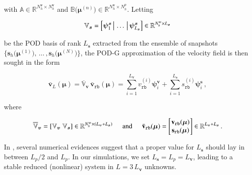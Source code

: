 \documentclass[longtitle]{elsarticle}
\numberwithin{equation}{section}
\theoremstyle{theorem}
\theoremstyle{definition}
\theoremstyle{remark}
\theoremstyle{proposition}
\numberwithin{figure}{section}
\newcommand{\bg}[1]{\boldsymbol{#1}}
\begin{document}
		with $\mathbb{A} \in \mathbb{R}^{N_h^{\bg{v}} \times N_h^{\bg{v}}}$ and $\mathbb{B} \big( \bg{\mu}^{(n)} \big) \in \mathbb{R}^{N_h^{\bg{v}} \times N_h^p}$. Letting 
		\vspace*{-0.1cm}
		\begin{linenomath}\begin{equation*}
			\mathbb{V}_{\bg{s}} = \left[ \bg{\psi}_1^{\bg{s}} \, \big| \, \ldots \, \big| \, \bg{\psi}_{L_{\bg{s}}}^{\bg{s}} \right] \in \mathbb{R}^{N_h^{\bg{v}} \times L_{\bg{s}}} 
			\vspace*{-0.1cm}
		\end{equation*}\end{linenomath}
		be the POD basis of rank $L_{\bg{s}}$ extracted from the ensemble of snapshots $\big\lbrace \mathbf{s}_h \big( \bg{\mu}^{(1)} \big) , \, \ldots \, , \mathbf{s}_h \big( \bg{\mu}^{(N)} \big) \big\rbrace$, the POD-G approximation of the velocity field is then sought in the form
		\vspace*{-0.2cm}
		\begin{linenomath}\begin{equation*}
			\bar{\mathbf{v}}_L(\bg{\mu}) = \overline{\mathbb{V}}_{\bg{v}} \, \bar{\mathbf{v}}_{\texttt{rb}}(\bg{\mu}) = \sum_{i = 1}^{L_{\bg{v}}} v_{\texttt{rb}}^{(i)} \bg{\psi}_i^{\bg{v}} + \sum_{i = 1}^{L_{\bg{s}}} s_{\texttt{rb}}^{(i)} \bg{\psi}_i^{\bg{s}} \, ,
		\end{equation*}\end{linenomath} 
		where
		\begin{linenomath}\begin{equation*}
			\overline{\mathbb{V}}_{\bg{v}} = \left[ \mathbb{V}_{\bg{v}} ~ \mathbb{V}_{\bg{s}} \right] \in \mathbb{R}^{N_h^{\bg{v}} \times (L_{\bg{v}} + L_{\bg{s}})} \hspace*{0.5cm} \text{and} \hspace*{0.5cm} \bar{\mathbf{v}}_{\texttt{rb}}(\bg{\mu}) =
			\begin{bmatrix}
			\hspace*{-0.15cm}
			\begin{array}{c}
				\mathbf{v}_{\texttt{rb}}(\bg{\mu}) \\
				\mathbf{s}_{\texttt{rb}}(\bg{\mu})
			\end{array} 
			\hspace*{-0.15cm}
			\end{bmatrix} 
			\in \mathbb{R}^{L_{\bg{v}} + L_{\bg{s}}} \, .
		\end{equation*}\end{linenomath}
		In \cite{Bal14}, several numerical evidences suggest that a proper value for $L_{\bg{s}}$ should lay in between $L_p / 2$ and $L_p$. In our simulations, we set $L_{\bg{s}} = L_p = L_{\bg{v}}$, leading to a stable reduced (nonlinear) system in $L = 3 \, L_{\bg{v}}$ unknowns.
\end{document}
